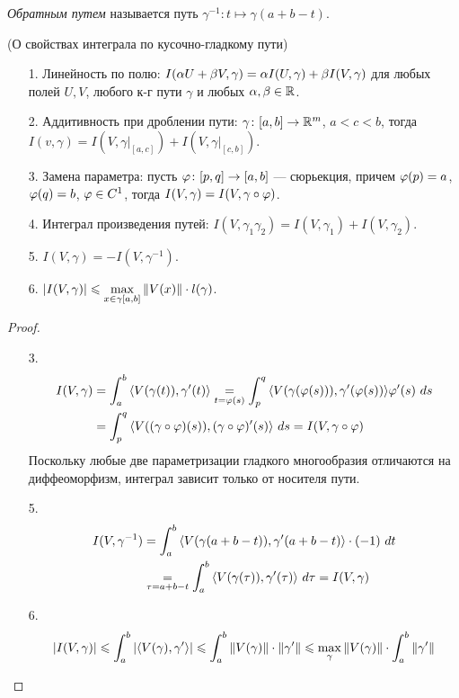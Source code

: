 \begin{definition}
    \textit{Обратным путем} называется путь $\gamma^{-1}: t \mapsto \gamma(a + b -
    t)$.
\end{definition}

\begin{theorem}(О свойствах интеграла по кусочно-гладкому пути)

    \begin{itemize}
        \item[1.] Линейность по полю:
            $I(\alpha U + \beta V, \gamma) = \alpha I(U, \gamma) + \beta I(V, \gamma)$ для любых
            полей $U, V$, любого к-г пути $\gamma$ и любых $\alpha, \beta \in \mathbb{R}$.
        \item[2.] Аддитивность при дроблении пути:
            $\gamma \colon [a, b] \to \mathbb{R}^m$, $a < c < b$, тогда \\
            $I(v, \gamma) = I(V, \gamma\big|_{[a, c]}) + I(V, \gamma\big|_{[c,
            b]})$.
        \item[3.] Замена параметра:
            пусть $\varphi \colon [p, q] \to [a, b]$ --- сюрьекция, причем $\varphi(p) = a$,
            $\varphi(q) = b$, $\varphi \in C^1$, тогда $I(V, \gamma) = I(V, \gamma \circ \varphi)$.
        \item[4.] Интеграл произведения путей:
            $I(V, \gamma_1 \gamma_2) = I(V, \gamma_1) + I(V, \gamma_2)$.
        \item[5.] $I(V, \gamma) = -I(V, \gamma^{-1})$.
        \item[6.] $\displaystyle |I(V, \gamma)| \leqslant \max_{x \in \gamma[a,
        b]}{\left\lVert V(x)\right\rVert} \cdot l(\gamma)$.
    \end{itemize}
\end{theorem}
\begin{proof}
    \enewline
    \begin{itemize}
        \item[3.]
\begin{align*}
    I(V, \gamma) &= \int_a^b{\langle V(\gamma(t)), \gamma'(t)\rangle} \underset{t = \varphi(s)}{=}
    \int_p^q{\langle V(\gamma(\varphi(s))), \gamma'(\varphi(s))\rangle \varphi'(s) ~ds} \\ &=
    \int_p^q{\langle V((\gamma \circ \varphi)(s)), (\gamma \circ \varphi)'(s)\rangle ~ds} = I(V, \gamma \circ \varphi)
\end{align*}
        Поскольку любые две параметризации гладкого многообразия отличаются
        на диффеоморфизм, интеграл зависит только от носителя пути.

        \item[5.]
\begin{align*}
    I(V, \gamma^{-1}) &= \int_a^b{\langle V(\gamma(a + b - t)), \gamma'(a + b - t)\rangle
    \cdot (-1) ~dt} \\
    &\underset{\tau = a + b - t}{=} \int_a^b{\langle V(\gamma(\tau)), \gamma'(\tau)\rangle ~d\tau}
    = I(V, \gamma)
\end{align*}
        \item[6.]
\[
    \left|I(V, \gamma)\right| \leqslant \int_a^b{\left|\langle V(\gamma), \gamma'\rangle\right|}
    \leqslant \int_a^b{\left\lVert V(\gamma)\right\rVert \cdot \left\lVert\gamma'\right\rVert} \leqslant
    \max_{\gamma}{\left\lVert V(\gamma)\right\rVert} \cdot \int_a^b{\left\lVert\gamma'\right\rVert}
\]
    \end{itemize}
\end{proof}

